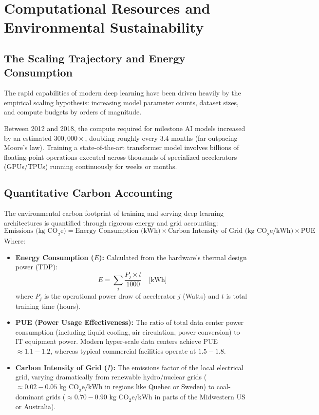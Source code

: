 \documentclass[12pt,a4paper]{article}
\begin{document}
\section{Computational Resources and Environmental Sustainability}

\subsection{The Scaling Trajectory and Energy Consumption}
The rapid capabilities of modern deep learning have been driven heavily by the empirical scaling hypothesis: increasing model parameter counts, dataset sizes, and compute budgets by orders of magnitude. 

Between 2012 and 2018, the compute required for milestone AI models increased by an estimated $300,000\times$, doubling roughly every 3.4 months (far outpacing Moore's law). Training a state-of-the-art transformer model involves billions of floating-point operations executed across thousands of specialized accelerators (GPUs/TPUs) running continuously for weeks or months.

\subsection{Quantitative Carbon Accounting}
The environmental carbon footprint of training and serving deep learning architectures is quantified through rigorous energy and grid accounting:
\begin{equation}
\text{Emissions (kg CO}_2\text{e)} = \text{Energy Consumption (kWh)} \times \text{Carbon Intensity of Grid (kg CO}_2\text{e/kWh)} \times \text{PUE}
\end{equation}
Where:
\begin{itemize}[leftmargin=*]
    \item \textbf{Energy Consumption ($E$):} Calculated from the hardware's thermal design power (TDP):
    \[
    E = \sum_{j} \frac{P_j \times t}{1000} \quad \text{[kWh]}
    \]
    where $P_j$ is the operational power draw of accelerator $j$ (Watts) and $t$ is total training time (hours).
    \item \textbf{PUE (Power Usage Effectiveness):} The ratio of total data center power consumption (including liquid cooling, air circulation, power conversion) to IT equipment power. Modern hyper-scale data centers achieve PUE $\approx 1.1 - 1.2$, whereas typical commercial facilities operate at $1.5 - 1.8$.
    \item \textbf{Carbon Intensity of Grid ($I$):} The emissions factor of the local electrical grid, varying dramatically from renewable hydro/nuclear grids ($\approx 0.02 - 0.05\text{ kg CO}_2\text{e/kWh}$ in regions like Quebec or Sweden) to coal-dominant grids ($\approx 0.70 - 0.90\text{ kg CO}_2\text{e/kWh}$ in parts of the Midwestern US or Australia).
\end{itemize}
\end{document}
